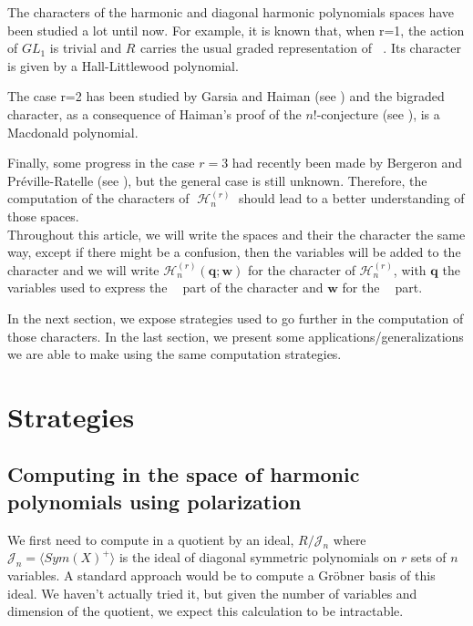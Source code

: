 \documentclass[letter,12pt]{article}
\newcommand{\pauline}[1]{\todo[linecolor=blue,backgroundcolor=cyan!25,bordercolor=blue]{#1}}
\DeclareMathOperator{\Sn}{\mathbb{S}_n}
\DeclareMathOperator{\GLr}{GL_r}
\DeclareMathOperator{\harmonics}{\mathcal{H}}
\begin{document}
   	
   	The characters of the harmonic and diagonal harmonic polynomials spaces have been studied a lot until now. For example, it is known that, when r=1, the action of $GL_1$ is trivial and $R_{\Sn}$ carries the usual graded representation of $\Sn$. Its character is given by a Hall-Littlewood polynomial.
   	
    The case r=2 has been studied by Garsia and Haiman (see \cite{GarsiaHaiman1993}) and the bigraded character, as a consequence of Haiman's proof of the $n!$-conjecture (see \cite{Haiman2002}), is a Macdonald polynomial.
    
	Finally, some progress in the case $r=3$ had recently been made by Bergeron and Préville-Ratelle (see \cite{BergeronPreville2012}), but the general case is still unknown. Therefore, the computation of the characters of $\harmonics_{n}^{(r)}$ should lead to a better understanding of those spaces. \\

	Throughout this article, we will write the spaces and their the character the same way, except if there might be a confusion, then the variables will be added to the character and we will write $\mathcal{H}_n^{(r)}(\bm{q};\bm{w})$ for the character of $\mathcal{H}_n^{(r)}$,  with $\bm{q}$ the variables used to express the $\GLr$ part of the character and $\bm{w}$ for the $\Sn$ part.
	
	In the next section, we expose strategies used to go further in the computation of those characters. In the last section, we present some applications/generalizations we are able to make using the same computation strategies. \pauline{annonce du contenu à réécrire}
	 
	
	
	\section{Strategies}
	
	\subsection{Computing in the space of harmonic polynomials using polarization}
	
	We first need to compute in a quotient by an ideal, $R / \mathcal{J}_n$ where $\mathcal{J}_n = \langle Sym(X)^+ \rangle$ is the ideal of diagonal symmetric polynomials on $r$ sets of $n$ variables.
	A standard approach would be to compute a Gröbner basis of this ideal.
	We haven't actually tried it, but given the number of variables and dimension of the quotient, we expect this calculation to be intractable.
	
\end{document}
